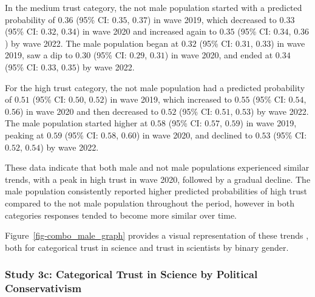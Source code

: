 \documentclass[
  single column]{article}
\begin{document}
In the medium trust category, the not male population started with a
predicted probability of \(0.36\) (95\% CI: \(0.35\), \(0.37\)) in wave
2019, which decreased to \(0.33\) (95\% CI: \(0.32\), \(0.34\)) in wave
2020 and increased again to \(0.35\) (95\% CI: \(0.34\), \(0.36\)) by
wave 2022. The male population began at \(0.32\) (95\% CI: \(0.31\),
\(0.33\)) in wave 2019, saw a dip to \(0.30\) (95\% CI: \(0.29\),
\(0.31\)) in wave 2020, and ended at \(0.34\) (95\% CI: \(0.33\),
\(0.35\)) by wave 2022.

For the high trust category, the not male population had a predicted
probability of \(0.51\) (95\% CI: \(0.50\), \(0.52\)) in wave 2019,
which increased to \(0.55\) (95\% CI: \(0.54\), \(0.56\)) in wave 2020
and then decreased to \(0.52\) (95\% CI: \(0.51\), \(0.53\)) by wave
2022. The male population started higher at \(0.58\) (95\% CI: \(0.57\),
\(0.59\)) in wave 2019, peaking at \(0.59\) (95\% CI: \(0.58\),
\(0.60\)) in wave 2020, and declined to \(0.53\) (95\% CI: \(0.52\),
\(0.54\)) by wave 2022.

These data indicate that both male and not male populations experienced
similar trends, with a peak in high trust in wave 2020, followed by a
gradual decline. The male population consistently reported higher
predicted probabilities of high trust compared to the not male
population throughout the period, however in both categories responses
tended to become more similar over time.

Figure~\ref{fig-combo_male_graph} provides a visual representation of
these trends , both for categorical trust in science and trust in
scientists by binary gender.

\subsubsection{Study 3c: Categorical Trust in Science by Political
Conservativism}\label{study-3c-categorical-trust-in-science-by-political-conservativism}
\end{document}
